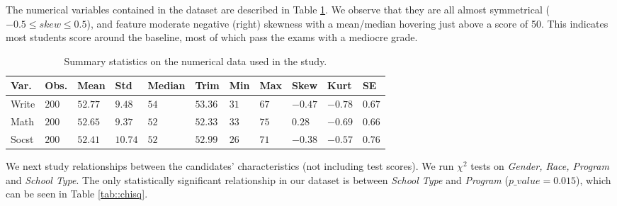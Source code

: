\documentclass[10pt, a4paper]{article}
\begin{document}
	
	The numerical variables contained in the dataset are described in Table \ref{tab::summary_stats}. We observe that they are all almost symmetrical ($-0.5 \leq skew \leq 0.5$), and feature moderate negative (right) skewness with a mean/median hovering just above a score of 50. This indicates most students score around the baseline, most of which pass the exams with a mediocre grade.
	
	\begin{table}
		\centering
		\begin{tabular}
			{ |p{1cm} p{0.5cm} p{0.7cm} p{0.5cm} p{1cm} p{0.7cm} p{0.5cm} p{0.5cm} p{0.5cm} p{0.5cm} p{0.5cm}| }
			\hline
			\textbf{Var.} & \textbf{Obs.} & \textbf{Mean} & \textbf{Std} & \textbf{Median} & \textbf{Trim} & \textbf{Min} & \textbf{Max} & \textbf{Skew} & \textbf{Kurt} & \textbf{SE}\\
			\hline
			Write & $200$ & $52.77$ & $9.48$ & $54$ & $53.36$ & $31$ & $67$ & $-0.47$ & $-0.78$ & $0.67$ \\
			Math & $200$ & $52.65$ & $9.37$ & $52$ & $52.33$ & $33$ & $75$ & $0.28$ & $-0.69$ & $0.66$ \\
			Socst & $200$ & $52.41$ & $10.74$ & $52$ &$ 52.99$ & $26$ & $71$ & $-0.38$ & $-0.57$ & $0.76$ \\
			\hline
		\end{tabular}
		\caption{Summary statistics on the numerical data used in the study.}
		\label{tab::summary_stats}
	\end{table}
	
	We next study relationships between the candidates' characteristics (not including test scores). We run $\chi^2$ tests on \textit{Gender, Race, Program} and \textit{School Type}. The only statistically significant relationship in our dataset is between \textit{School Type} and \textit{Program} ($p\_value = 0.015$), which can be seen in Table \ref{tab::chisq}.
	
\end{document}
